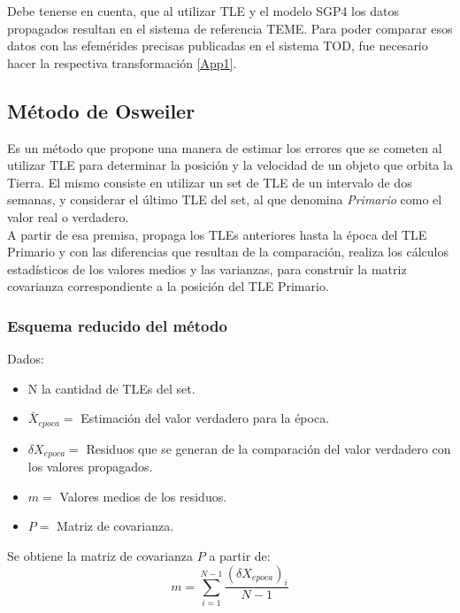 {Debe tenerse en cuenta, que al utilizar TLE y el modelo SGP4  los datos propagados resultan en el sistema de referencia \ac{TEME}. Para poder comparar esos datos con las efem\'erides precisas publicadas en el sistema TOD, fue necesario hacer la respectiva transformaci\'on \ref{App1}.\\

\subsection{M\'etodo de Osweiler}\label{subsec:osw}
Es un m\'etodo que propone una manera de estimar los errores que se cometen al utilizar TLE para determinar la posici\'on y la velocidad de un objeto que orbita la Tierra.
El mismo consiste en utilizar un set de TLE de un intervalo de dos semanas, y considerar el \'ultimo TLE del set, al que denomina {\it{Primario}} como el valor real o verdadero.\\
A partir de esa premisa, propaga los TLEs anteriores hasta la \'epoca del TLE Primario y con las diferencias que resultan de la comparaci\'on, realiza los c\'alculos estad\'isticos de los valores medios y las varianzas, para construir la matriz covarianza correspondiente a la posici\'on del TLE Primario.\\

\subsubsection*{Esquema reducido del m\'etodo}

Dados:
\begin{itemize}
\itemsep0em
 \item N la cantidad de TLEs del set.
 \item $\bar{X}_{epoca} = $  Estimaci\'on del valor verdadero para la \'epoca.
 \item $\delta X_{epoca} = $ Residuos que se generan de la comparaci\'on del valor verdadero con los valores propagados.
 \item $m = $ Valores medios de los residuos.
 \item $P = $ Matriz de covarianza.
\end{itemize}

Se obtiene la matriz de covarianza $P$ a partir de:\\

\begin{equation}
 m=\sum_{i=1}^{N-1} \frac{(\delta X_{epoca})_{i}}{N-1} 
\end{equation}

}
